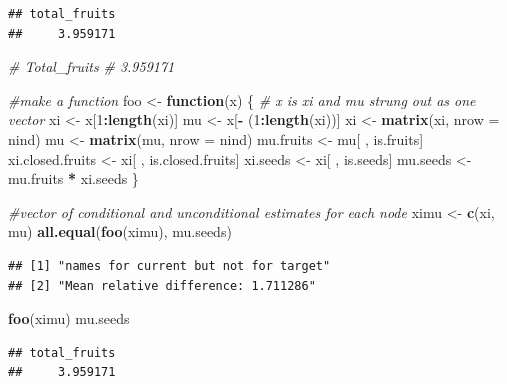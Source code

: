 \documentclass[
]{article}
\newenvironment{Shaded}{\begin{snugshade}}{\end{snugshade}}
\newcommand{\AttributeTok}[1]{\textcolor[rgb]{0.13,0.29,0.53}{#1}}
\newcommand{\CommentTok}[1]{\textcolor[rgb]{0.56,0.35,0.01}{\textit{#1}}}
\newcommand{\ControlFlowTok}[1]{\textcolor[rgb]{0.13,0.29,0.53}{\textbf{#1}}}
\newcommand{\DecValTok}[1]{\textcolor[rgb]{0.00,0.00,0.81}{#1}}
\newcommand{\FunctionTok}[1]{\textcolor[rgb]{0.13,0.29,0.53}{\textbf{#1}}}
\newcommand{\NormalTok}[1]{#1}
\newcommand{\OtherTok}[1]{\textcolor[rgb]{0.56,0.35,0.01}{#1}}
\newcommand{\SpecialCharTok}[1]{\textcolor[rgb]{0.81,0.36,0.00}{\textbf{#1}}}
\begin{document}
\begin{verbatim}
## total_fruits 
##     3.959171
\end{verbatim}

\begin{Shaded}
\begin{Highlighting}[]
\CommentTok{\# Total\_fruits }
\CommentTok{\#   3.959171}

\CommentTok{\#make a  function}
\NormalTok{foo }\OtherTok{\textless{}{-}} \ControlFlowTok{function}\NormalTok{(x) \{}
\CommentTok{\# x is xi and mu strung out as one vector}
\NormalTok{xi }\OtherTok{\textless{}{-}}\NormalTok{ x[}\DecValTok{1}\SpecialCharTok{:}\FunctionTok{length}\NormalTok{(xi)]}
\NormalTok{mu }\OtherTok{\textless{}{-}}\NormalTok{ x[}\SpecialCharTok{{-}}\NormalTok{ (}\DecValTok{1}\SpecialCharTok{:}\FunctionTok{length}\NormalTok{(xi))]}
\NormalTok{xi }\OtherTok{\textless{}{-}} \FunctionTok{matrix}\NormalTok{(xi, }\AttributeTok{nrow =}\NormalTok{ nind)}
\NormalTok{mu }\OtherTok{\textless{}{-}} \FunctionTok{matrix}\NormalTok{(mu, }\AttributeTok{nrow =}\NormalTok{ nind)}
\NormalTok{mu.fruits }\OtherTok{\textless{}{-}}\NormalTok{ mu[ , is.fruits]}
\NormalTok{xi.closed.fruits }\OtherTok{\textless{}{-}}\NormalTok{ xi[ , is.closed.fruits]}
\NormalTok{xi.seeds }\OtherTok{\textless{}{-}}\NormalTok{ xi[ , is.seeds]}
\NormalTok{mu.seeds }\OtherTok{\textless{}{-}}\NormalTok{ mu.fruits }\SpecialCharTok{*}\NormalTok{ xi.seeds}
\NormalTok{\}}

\CommentTok{\#vector of conditional and unconditional estimates for each node }
\NormalTok{ximu }\OtherTok{\textless{}{-}} \FunctionTok{c}\NormalTok{(xi, mu)}
\FunctionTok{all.equal}\NormalTok{(}\FunctionTok{foo}\NormalTok{(ximu), mu.seeds)}
\end{Highlighting}
\end{Shaded}

\begin{verbatim}
## [1] "names for current but not for target"
## [2] "Mean relative difference: 1.711286"
\end{verbatim}

\begin{Shaded}
\begin{Highlighting}[]
\FunctionTok{foo}\NormalTok{(ximu)}
\NormalTok{mu.seeds}
\end{Highlighting}
\end{Shaded}

\begin{verbatim}
## total_fruits 
##     3.959171
\end{verbatim}
\end{document}
